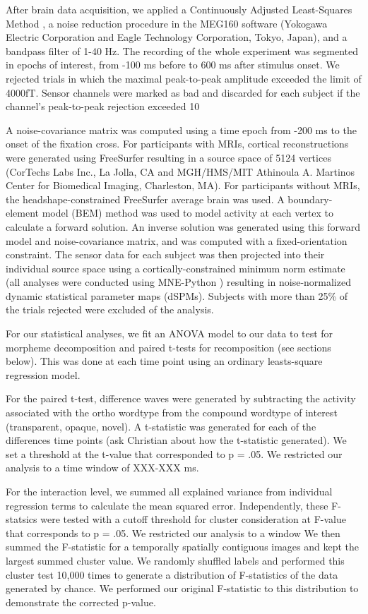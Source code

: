 \documentclass{frontiersSCNS}
\begin{document}
After brain data acquisition, we applied a Continuously Adjusted Least-Squares Method \citep{Adachi:2001}, a noise reduction procedure in the MEG160 software (Yokogawa Electric Corporation and Eagle Technology Corporation, Tokyo, Japan), and a bandpass filter of 1-40 Hz.  The recording of the whole experiment was segmented in epochs of interest, from -100 ms before to 600 ms after stimulus onset.  We rejected trials in which the maximal peak-to-peak amplitude exceeded the limit of 4000fT. Sensor channels were marked as bad and discarded for each subject if the channel’s peak-to-peak rejection exceeded 10%

A noise-covariance matrix was computed using a time epoch from -200 ms to the onset of the fixation cross.  For participants with MRIs, cortical reconstructions were generated using FreeSurfer resulting in a source space of 5124 vertices (CorTechs Labs Inc., La Jolla, CA and MGH/HMS/MIT Athinoula A. Martinos Center for Biomedical Imaging, Charleston, MA). For participants without MRIs, the headshape-constrained FreeSurfer average brain was used. A boundary-element model (BEM) method was used to model activity at each vertex to calculate a forward solution. An inverse solution was generated using this forward model and noise-covariance matrix, and was computed with a fixed-orientation constraint. 
The sensor data for each subject was then projected into their individual source space using a cortically-constrained minimum norm estimate (all analyses were conducted using MNE-Python \citet*{Gramfort:2013, Gramfort:2013a}) resulting in noise-normalized dynamic statistical parameter maps (dSPMs). Subjects with more than 25\% of the trials rejected were excluded of the analysis.

For our statistical analyses, we fit an ANOVA model to our data to test for morpheme decomposition and paired t-tests for recomposition (see sections below). This was done at each time point using an ordinary leasts-square regression model. 


For the paired t-test, difference waves were generated by subtracting the activity associated with the ortho wordtype from the compound wordtype of interest (transparent, opaque, novel). A t-statistic was generated for each of the differences time points (ask Christian about how the t-statistic generated). We set a threshold at the t-value that corresponded to p = .05. We restricted our analysis to a time window of XXX-XXX ms. 

For the interaction level, we summed all explained variance from individual regression terms to calculate the mean squared error. Independently, these F-statsics were tested with a cutoff threshold for cluster consideration at F-value that corresponds to p = .05. We restricted our analysis to a window We then summed the F-statistic for a temporally spatially contiguous images and kept the largest summed cluster value. We randomly shuffled labels and performed this cluster test 10,000 times to generate a distribution of F-statistics of the data generated by chance. We performed our original F-statistic to this distribution to demonstrate the corrected p-value. 
\end{document}
